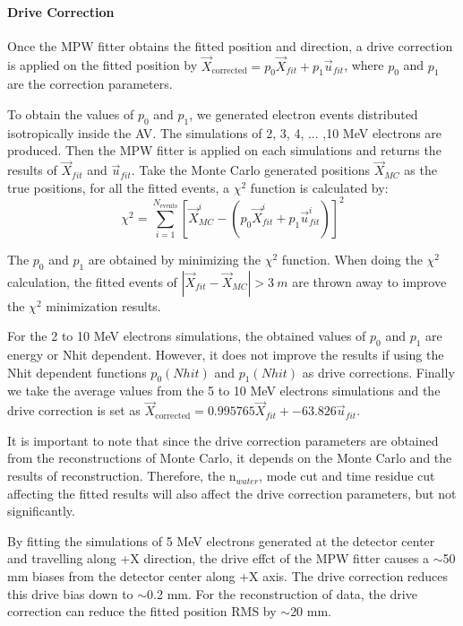 \paragraph{Drive Correction}
Once the MPW fitter obtains the fitted position and direction, a drive correction is applied on the fitted position by $\vec{X}_{\mathrm{corrected}} = p_0\vec{X}_{fit}+p_1\vec{u}_{fit}$, where $p_0$ and $p_1$ are the correction parameters.


To obtain the values of $p_0$ and $p_1$, we generated electron events distributed isotropically inside the AV. The simulations of 2, 3, 4, ... ,10 MeV electrons are produced. Then the MPW fitter is applied on each simulations and returns the results of $\vec{X}_{fit}$ and $\vec{u}_{fit}$. Take the Monte Carlo generated positions $\vec{X}_{MC}$ as the true positions, for all the fitted events, a $\chi^2$ function is calculated by:
\[
\chi^2 = \sum_{i=1}^{N_{\mathrm{events}}}[\vec{X}^i_{MC}-(p_0\vec{X}^i_{fit}+p_1\vec{u}^i_{fit})]^2
\]

The $p_0$ and $p_1$ are obtained by minimizing the $\chi^2$ function. 
When doing the $\chi^2$ calculation, the fitted events of $|\vec{X}_{fit}-\vec{X}_{MC}|>3~m$ are thrown away to improve the $\chi^2$ minimization results.

For the 2 to 10 MeV electrons simulations, the obtained values of $p_0$ and $p_1$ are energy or Nhit dependent. However, it does not improve the results if using the Nhit dependent functions $p_0(Nhit)$ and $p_1(Nhit)$ as drive corrections.
Finally we take the average values from the 5 to 10 MeV electrons simulations and the drive correction is set as $\vec{X}_{\mathrm{corrected}} = 0.995765\vec{X}_{fit}+-63.826\vec{u}_{fit}$.

It is important to note that since the drive correction parameters are obtained from the reconstructions of Monte Carlo, it depends on the Monte Carlo and the results of reconstruction. Therefore, the n$_{water}$, mode cut and time residue cut affecting the fitted results will also affect the drive correction parameters, but not significantly.

By fitting the simulations of 5 MeV electrons generated at the detector center and travelling along +X direction, the drive effct of the MPW fitter causes a $\sim$50 mm biases from the detector center along +X axis. The drive correction reduces this drive bias down to $\sim$0.2 mm. For the reconstruction of  data, the drive correction can reduce the fitted position RMS by $\sim$20 mm.


